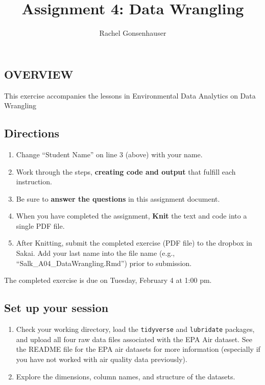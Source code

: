 \documentclass[]{article}
\title{Assignment 4: Data Wrangling}
\author{Rachel Gonsenhauser}
\date{}
\providecommand{\tightlist}{%
  \setlength{\itemsep}{0pt}\setlength{\parskip}{0pt}}
\begin{document}
\maketitle

\hypertarget{overview}{%
\subsection{OVERVIEW}\label{overview}}

This exercise accompanies the lessons in Environmental Data Analytics on
Data Wrangling

\hypertarget{directions}{%
\subsection{Directions}\label{directions}}

\begin{enumerate}
\def\labelenumi{\arabic{enumi}.}
\tightlist
\item
  Change ``Student Name'' on line 3 (above) with your name.
\item
  Work through the steps, \textbf{creating code and output} that fulfill
  each instruction.
\item
  Be sure to \textbf{answer the questions} in this assignment document.
\item
  When you have completed the assignment, \textbf{Knit} the text and
  code into a single PDF file.
\item
  After Knitting, submit the completed exercise (PDF file) to the
  dropbox in Sakai. Add your last name into the file name (e.g.,
  ``Salk\_A04\_DataWrangling.Rmd'') prior to submission.
\end{enumerate}

The completed exercise is due on Tuesday, February 4 at 1:00 pm.

\hypertarget{set-up-your-session}{%
\subsection{Set up your session}\label{set-up-your-session}}

\begin{enumerate}
\def\labelenumi{\arabic{enumi}.}
\item
  Check your working directory, load the \texttt{tidyverse} and
  \texttt{lubridate} packages, and upload all four raw data files
  associated with the EPA Air dataset. See the README file for the EPA
  air datasets for more information (especially if you have not worked
  with air quality data previously).
\item
  Explore the dimensions, column names, and structure of the datasets.
\end{enumerate}
\end{document}
